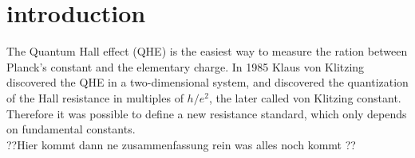 \section{introduction}
The Quantum Hall effect (QHE) is the easiest way to measure the ration between Planck's constant
and the elementary charge. In 1985 Klaus von Klitzing discovered the QHE in a two-dimensional system, and
discovered the quantization of the Hall resistance in multiples of $h/e^2$, the later called von Klitzing constant.
Therefore it was possible to define a new resistance standard, which only depends on fundamental constants.\\
??Hier kommt dann ne zusammenfassung rein was alles noch kommt ??
\newpage

